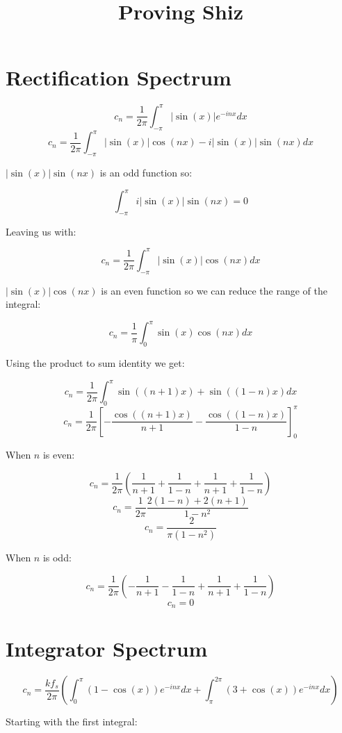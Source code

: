 \documentclass[a4paper]{article}
\title{Proving Shiz}
\author{}
\date{}
\begin{document}
\maketitle

\section{Rectification Spectrum}
	
	\[ c_{n} = \frac{1}{2\pi} \int_{-\pi}^{\pi} |\sin(x)|e^{-inx} dx \]
	\[ c_{n} = \frac{1}{2\pi} \int_{-\pi}^{\pi} |\sin(x)|\cos(nx) - i|\sin(x)|\sin(nx) dx \]

	$|\sin(x)|\sin(nx)$ is an odd function so:

	\[ \int_{-\pi}^{\pi} i|\sin(x)|\sin(nx) = 0 \]

	Leaving us with:

	\[ c_{n} = \frac{1}{2\pi} \int_{-\pi}^{\pi} |\sin(x)|\cos(nx) dx \]

	$|\sin(x)|\cos(nx)$ is an even function so we can reduce the range of the integral:

	\[ c_{n} = \frac{1}{\pi} \int_{0}^{\pi} \sin(x)\cos(nx) dx \]

	Using the product to sum identity we get:

	\[ c_{n} = \frac{1}{2\pi} \int_{0}^{\pi} \sin((n+1)x) + \sin((1-n)x) dx \]
	\[ c_{n} = \frac{1}{2\pi} \left[ -\frac{\cos((n+1)x)}{n+1} - \frac{\cos((1-n)x)}{1-n} \right]_{0}^{\pi} \]

	When $n$ is even:

	\[ c_{n} = \frac{1}{2\pi} \left( \frac{1}{n+1} + \frac{1}{1-n} + \frac{1}{n+1} + \frac{1}{1-n} \right) \]
	\[ c_{n} = \frac{1}{2\pi} \frac{2(1-n) + 2(n+1)}{1 - n^{2}} \]
	\[ \boxed{c_{n} = \frac{2}{\pi(1 - n^{2})}} \]

	When $n$ is odd:

	\[ c_{n} = \frac{1}{2\pi} \left( -\frac{1}{n+1} - \frac{1}{1-n} + \frac{1}{n+1} + \frac{1}{1-n} \right) \]
	\[ \boxed{c_{n} = 0} \]

\section{Integrator Spectrum}
	
	\[ c_{n} = \frac{kf_{s}}{2\pi} \left( \int_{0}^{\pi} (1-\cos(x))e^{-inx} dx
				              + \int_{\pi}^{2\pi} (3 + \cos(x))e^{-inx} dx 
			                      \right) \]

	Starting with the first integral:
	
\end{document}
